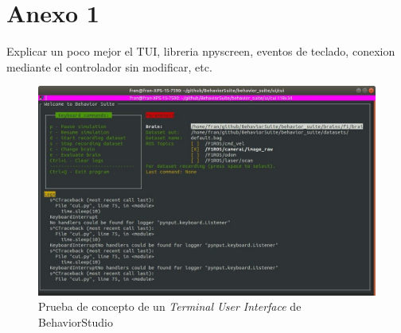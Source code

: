 \chapter{Anexo 1}
\label{an:tui}


Explicar un poco mejor el TUI, libreria npyscreen, eventos de teclado, conexion mediante el controlador sin modificar, etc.

\begin{figure}
  \centering
  \includegraphics[width=.8\linewidth]{img/tui.jpg}
  \caption{Prueba de concepto de un \textit{Terminal User Interface} de BehaviorStudio}
  \label{fig:frame}
\end{figure}